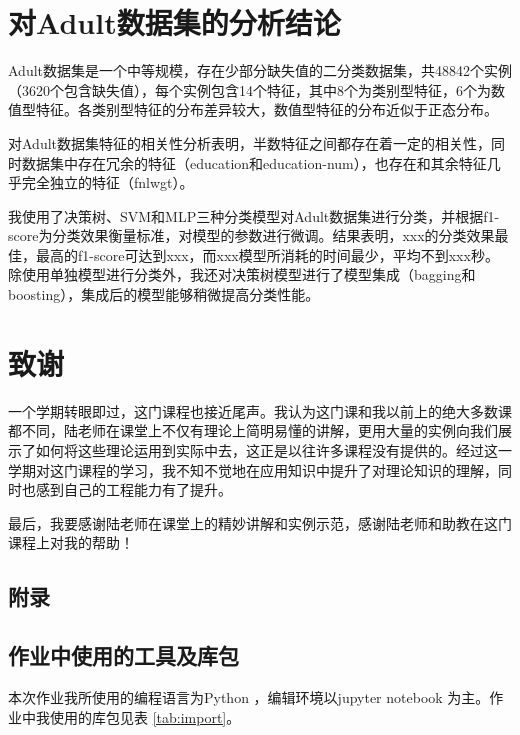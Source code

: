 \documentclass[12pt,a4paper]{article}
\theoremstyle{definition}
\begin{document}
{\section{对Adult数据集的分析结论}

Adult数据集是一个中等规模，存在少部分缺失值的二分类数据集，共48842个实例（3620个包含缺失值），每个实例包含14个特征，其中8个为类别型特征，6个为数值型特征。各类别型特征的分布差异较大，数值型特征的分布近似于正态分布。

\vspace{0.01\linewidth}
对Adult数据集特征的相关性分析表明，半数特征之间都存在着一定的相关性，同时数据集中存在冗余的特征（education和education-num），也存在和其余特征几乎完全独立的特征（fnlwgt）。

\vspace{0.01\linewidth}
我使用了决策树、SVM和MLP三种分类模型对Adult数据集进行分类，并根据f1-score为分类效果衡量标准，对模型的参数进行微调。结果表明，xxx的分类效果最佳，最高的f1-score可达到xxx，而xxx模型所消耗的时间最少，平均不到xxx秒。除使用单独模型进行分类外，我还对决策树模型进行了模型集成（bagging和boosting），集成后的模型能够稍微提高分类性能。

\section{致谢}

一个学期转眼即过，这门课程也接近尾声。我认为这门课和我以前上的绝大多数课都不同，陆老师在课堂上不仅有理论上简明易懂的讲解，更用大量的实例向我们展示了如何将这些理论运用到实际中去，这正是以往许多课程没有提供的。经过这一学期对这门课程的学习，我不知不觉地在应用知识中提升了对理论知识的理解，同时也感到自己的工程能力有了提升。

\vspace{0.01\linewidth}
最后，我要感谢陆老师在课堂上的精妙讲解和实例示范，感谢陆老师和助教在这门课程上对我的帮助！

\newpage
\begin{appendix}
	\section{附录}
	\subsection{作业中使用的工具及库包}
	\label{apd:tools}
	本次作业我所使用的编程语言为Python \cite{python}，编辑环境以jupyter notebook \cite{notebook} 为主。作业中我使用的库包见表 \ref{tab:import}。
	

\end{appendix}}
\end{document}
